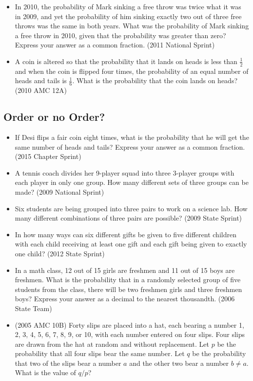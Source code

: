 \documentclass{article}
\begin{document}
\begin{itemize}
\item In 2010, the probability of Mark sinking a free throw was twice what it was in 2009, and yet the probability of him sinking exactly two out of three free throws was the same in both years. What was the probability of Mark sinking a free throw in 2010, given that the probability was greater than zero? Express your answer as a common fraction. (2011 National Sprint)

\item  A coin is altered so that the probability that it lands on heads is less than $\frac{1}{2}$ and when the coin is flipped four times, the probability of an equal number of heads and tails is $\frac{1}{6}$. What is the probability that the coin lands on heads? (2010 AMC 12A)

\end{itemize}


\subsection{Order or no Order?}


\begin{itemize}

\item If Desi flips a fair coin eight times, what is the probability that he will get the same number of heads and tails? Express your answer as a common fraction. (2015 Chapter Sprint)

\item A tennis coach divides her 9-player squad into three 3-player groups with each player in only one group. How many different sets of three groups can be made? (2009 National Sprint)

\item Six students are being grouped into three pairs to work on a science lab. How many different combinations of three pairs are possible? (2009 State Sprint)


\item In how many ways can six different gifts be given to five different children with each child receiving at least one gift and each gift being given to exactly one child? (2012 State Sprint)

\item In a math class, 12 out of 15 girls are freshmen and 11 out of 15 boys are freshmen. What is the probability that in a randomly selected group of five students from the class, there will be two freshmen girls and three freshmen boys? Express your answer as a decimal to the nearest thousandth. (2006 State Team)

\item (2005 AMC 10B) Forty slips are placed into a hat, each bearing a number 1, 2, 3, 4, 5, 6, 7, 8, 9, or 10, with each number entered on four slips. Four slips are drawn from the hat at random and without replacement. Let $p$ be the probability that all four slips bear the same number. Let $q$ be the probability that two of the slips bear a number $a$ and the other two bear a number $b\neq a$. What is the value of $q/p$?


\end{itemize}
\end{document}
